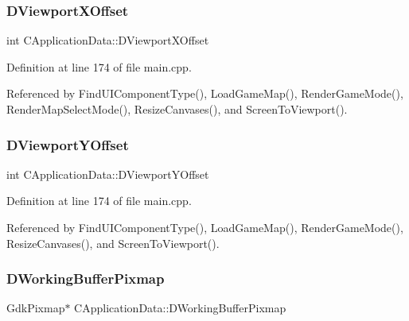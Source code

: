 \subsubsection{\texorpdfstring{D\+Viewport\+X\+Offset}{DViewportXOffset}}
{\footnotesize\ttfamily int C\+Application\+Data\+::\+D\+Viewport\+X\+Offset\hspace{0.3cm}{\ttfamily [protected]}}



Definition at line 174 of file main.\+cpp.



Referenced by Find\+U\+I\+Component\+Type(), Load\+Game\+Map(), Render\+Game\+Mode(), Render\+Map\+Select\+Mode(), Resize\+Canvases(), and Screen\+To\+Viewport().

\hypertarget{classCApplicationData_afc58ed96a1af813b28f6abf2c7d2dc72}{}\label{classCApplicationData_afc58ed96a1af813b28f6abf2c7d2dc72} 
\subsubsection{\texorpdfstring{D\+Viewport\+Y\+Offset}{DViewportYOffset}}
{\footnotesize\ttfamily int C\+Application\+Data\+::\+D\+Viewport\+Y\+Offset\hspace{0.3cm}{\ttfamily [protected]}}



Definition at line 174 of file main.\+cpp.



Referenced by Find\+U\+I\+Component\+Type(), Load\+Game\+Map(), Render\+Game\+Mode(), Resize\+Canvases(), and Screen\+To\+Viewport().

\hypertarget{classCApplicationData_afa34cf2780f38dd28c0c811e69d60a97}{}\label{classCApplicationData_afa34cf2780f38dd28c0c811e69d60a97} 
\subsubsection{\texorpdfstring{D\+Working\+Buffer\+Pixmap}{DWorkingBufferPixmap}}
{\footnotesize\ttfamily Gdk\+Pixmap$\ast$ C\+Application\+Data\+::\+D\+Working\+Buffer\+Pixmap\hspace{0.3cm}{\ttfamily [protected]}}



